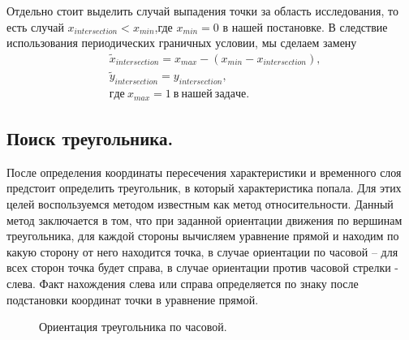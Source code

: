 \documentclass[14pt]{article}
\begin{document}
Отдельно стоит выделить случай выпадения точки за область исследования, то есть случай $x_{intersection}<x_{min}$,где $x_{min}=0$ в нашей постановке.  В следствие использования периодических граничных условии, мы сделаем замену 
\begin{equation}
\begin{aligned}
&\widetilde{x}_{intersection}=x_{max}-(x_{min}-x_{intersection} ),\\
&\widetilde{y}_{intersection}=y_{intersection},\\
&где\: x_{max}=1\: в\: нашей\: задаче. 
\end{aligned}
\end{equation}
\subsection{Поиск треугольника.}
После определения координаты пересечения характеристики и временного слоя предстоит определить треугольник, в который характеристика попала. Для этих целей воспользуемся методом известным как метод относительности. Данный метод заключается в том, что при заданной ориентации движения по вершинам треугольника, для каждой стороны вычисляем уравнение прямой и находим по какую сторону от него находится точка, в случае ориентации по часовой – для всех сторон точка будет справа, в случае ориентации против часовой стрелки - слева. Факт нахождения слева или справа определяется по знаку после подстановки координат точки в уравнение прямой.
\begin{figure}[!h!]
\caption{Ориентация треугольника по часовой.}
\end{figure}
\end{document}
